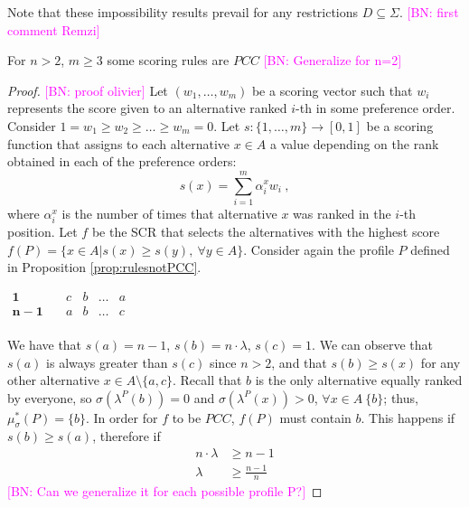 \documentclass[version=3.21, pagesize, notitlepage, twoside=off, bibliography=totoc, DIV=calc, fontsize=11pt, a4paper]{scrartcl}
\newcommand{\commentBN}[1]{\textcolor{magenta}{\small$\big[$BN: #1$\big]$}}
\newcommand{\mustar}{\mu_{\sigma}^*}
\begin{document}
\noindent Note that these impossibility results prevail for any restrictions $D \subseteq \Sigma$. \commentBN{first comment Remzi}

\begin{proposition}
	For $n>2$, $m\geq3$ some scoring rules are  $PCC$ \commentBN{Generalize for n=2}
\end{proposition}
\begin{proof}
	\commentBN{proof olivier}
	Let $(w_1, \dots, w_m)$ be a scoring vector such that $w_i$ represents the score given to an alternative ranked $i$-th in some preference order. Consider $1 = w_1 \geq w_2 \geq \dots \geq w_{m} = 0$. Let $s:\{1,\dots,m\}\rightarrow [0,1]$ be a scoring function that assigns to each alternative $x \in A$ a value depending on the rank obtained in each of the preference orders: 
	\[ s(x) = \sum_{i=1}^{m} \alpha^{x}_i w_i \ ,\]
	where $\alpha^{x}_i$ is the number of times that alternative $x$ was ranked in the $i$-th position. Let $f$ be the SCR that selects the alternatives with the highest score $f(P)=\{x \in A | s(x)\geq s(y), \ \forall y \in A\}$.
	Consider again the profile $P$ defined in Proposition \ref{prop:rulesnotPCC}.
	\begin{center}
		$
		\begin{array}{ccccc}
		\mathbf{1} \quad &c&b&\dots &a\\
		\mathbf{n-1} \quad &a&b&\dots &c\\		
		\end{array}
		$
	\end{center}
	We have that $s(a)=n-1$, $s(b)=n\cdot \lambda$, $s(c)=1$. We can observe that $s(a)$ is always greater than $s(c)$ since $n>2$, and that $s(b)\geq s(x)$ for any other alternative $x\in A \setminus \{a,c\}$. Recall that $b$ is the only alternative equally ranked by everyone, so $\sigma(\lambda^P(b))=0$ and $\sigma(\lambda^P(x))>0$, $\forall x \in A \ \{b\}$; thus, $\mustar(P)=\{b\}$. In order for $f$ to be $PCC$, $f(P)$ must contain $b$. This happens if $s(b)\geq s(a)$, therefore if 
	\begin{align*}
	n\cdot\lambda &\geq n-1 \\
	\lambda &\geq \frac{n-1}{n} 
	\end{align*}
	\commentBN{Can we generalize it for each possible profile P?}
\end{proof}
	
\end{document}
